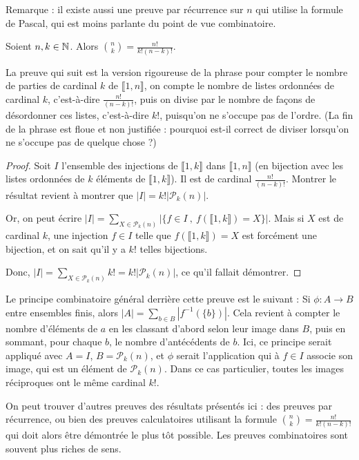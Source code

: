 Remarque : il existe aussi une preuve par récurrence sur $n$ qui utilise la formule de Pascal, qui est moins parlante du point de vue combinatoire.

\begin{proposition}Soient $n, k\in \mathbb{N}$. Alors $\binom{n}{k} = \frac{n!}{k!(n-k)!}$.
\end{proposition}

La preuve qui suit est la version rigoureuse de la phrase \og pour compter le nombre de parties de cardinal $k$ de $\llbracket 1,n\rrbracket$, on compte le nombre de  listes ordonnées de cardinal $k$, c'est-à-dire $\frac{n!}{(n-k)!}$, puis on divise par le nombre de façons de désordonner ces listes, c'est-à-dire $k!$, puisqu'on ne s'occupe pas de l'ordre\fg. (La fin de la phrase est floue et non justifiée : pourquoi est-il correct de \og diviser\fg{} lorsqu'on ne \og s'occupe pas\fg{} de quelque chose ?)

\begin{proof} 

Soit $I$ l'ensemble des injections de $\llbracket 1,k\rrbracket$ dans $\llbracket 1,n\rrbracket$ (en bijection avec les listes ordonnées de $k$ éléments de $\llbracket 1,k\rrbracket$). Il est de cardinal $\frac{n!}{(n-k)!}$. Montrer le résultat revient à montrer que $|I| = k! |\mathcal P_k(n)|$.

Or, on peut écrire $|I| = \sum_{X\in \mathcal P_k(n)} \left| \{f\in I\:,\: f(\llbracket 1,k\rrbracket)=X\}\right|$. Mais si $X$ est de cardinal $k$, une injection $f\in I$ telle que  $f(\llbracket 1,k\rrbracket)=X$ est forcément une bijection, et on sait qu'il y a $k!$ telles bijections.

Donc, $|I| = \sum_{X\in \mathcal P_k(n)} k! = k! |\mathcal P_k(n)|$, ce qu'il fallait démontrer.
\end{proof}

\begin{remarque}
Le principe combinatoire général derrière cette preuve est le suivant : Si $\phi : A\to B$ entre ensembles finis, alors $|A| = \sum_{b\in B} \left|f^{-1}(\{b\})\right|$. Cela revient à compter le nombre d'éléments de $a$ en les classant d'abord selon leur image dans $B$, puis en sommant, pour chaque $b$, le nombre d'antécédents de $b$. Ici, ce principe serait appliqué avec $A=I$, $B=\mathcal P_k(n)$, et $\phi$ serait l'application qui à $f\in I$ associe son image, qui est un élément de $\mathcal P_k(n)$. Dans ce cas particulier, toutes les images réciproques ont le même cardinal $k!$.
\end{remarque}

\begin{remarque}
On peut trouver d'autres preuves des résultats présentés ici : des preuves par récurrence, ou bien des preuves calculatoires utilisant la formule $\binom{n}{k} = \frac{n!}{k!(n-k)!}$ qui doit alors être démontrée le plus tôt possible. Les preuves combinatoires sont souvent plus riches de sens.
\end{remarque}